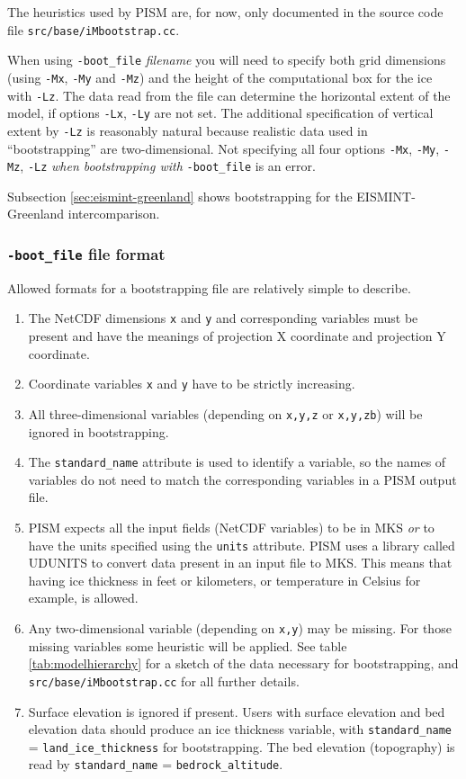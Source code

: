 \documentclass[titlepage,letterpaper,final]{scrartcl}
\newcommand{\txtopt}[2]{\texttt{-#1} #2\optindex{\texttt{-#1} #2}}
\newcommand{\fileopt}[1]{\txtopt{#1}{\emph{filename}}}
\begin{document}
The heuristics used by PISM are, for now, only documented in the source code file \texttt{src/base/iMbootstrap.cc}.

When using \fileopt{boot_file} you will need to specify both grid dimensions (using \texttt{-Mx}, \texttt{-My} and \texttt{-Mz}) and the height of the computational box for the ice with \texttt{-Lz}.  The data read from the file can determine the horizontal extent of the model, if options \texttt{-Lx}, \texttt{-Ly} are not set.  The additional specification of vertical extent by \texttt{-Lz} is reasonably natural because realistic data used in ``bootstrapping'' are two-dimensional.  Not specifying all four options \texttt{-Mx}, \texttt{-My}, \texttt{-Mz}, \texttt{-Lz} \emph{when bootstrapping with} \texttt{-boot_file} is an error.

Subsection \ref{sec:eismint-greenland} shows bootstrapping for the EISMINT-Greenland intercomparison.

\subsubsection*{\texttt{-boot_file} file format}
\label{sec:bootstrapping-format}  Allowed formats for a bootstrapping file are relatively simple to describe. 
\begin{enumerate}
\item The NetCDF dimensions \texttt{x} and \texttt{y} and corresponding variables must be present and have the meanings of projection X coordinate and projection Y coordinate.
\item Coordinate variables \texttt{x} and \texttt{y} have to be strictly increasing.
\item All three-dimensional variables (depending on \texttt{x,y,z} or \texttt{x,y,zb}) will be ignored in bootstrapping.
\item The \texttt{standard_name} attribute is used to identify a variable, so the names of variables do not need to match the corresponding variables in a PISM output file.
\item PISM expects all the input fields (NetCDF variables) to be in MKS \emph{or} to have the units specified using the \texttt{units} attribute.  PISM uses a library called UDUNITS to convert data present in an input file to MKS.   This means that having ice thickness in feet or kilometers, or temperature in Celsius for example, is allowed.
\item Any two-dimensional variable (depending on \texttt{x,y}) may be missing.  For those missing variables some heuristic will be applied.  See table \ref{tab:modelhierarchy} for a sketch of the data necessary for bootstrapping, and \texttt{src/base/iMbootstrap.cc} for all further details.
\item Surface elevation is ignored if present.  Users with surface elevation and bed elevation data should produce an ice thickness variable, with \texttt{standard_name} = \texttt{land_ice_thickness} for bootstrapping.  The bed elevation (topography) is read by \texttt{standard_name} = \texttt{bedrock_altitude}.
\end{enumerate}
\end{document}
